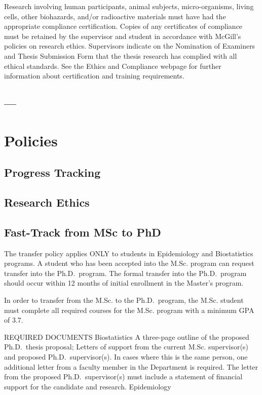 \documentclass[
]{book}
\begin{document}
Research involving human participants, animal subjects, micro-organisms, living cells, other biohazards, and/or radioactive materials must have had the appropriate compliance certification. Copies of any certificates of compliance must be retained by the supervisor and student in accordance with McGill's policies on research ethics. Supervisors indicate on the Nomination of Examiners and Thesis Submission Form that the thesis research has complied with all ethical standards. See the Ethics and Compliance webpage for further information about certification and training requirements.

\hypertarget{section-6}{%
\section{---}\label{section-6}}

\hypertarget{policies}{%
\chapter{Policies}\label{policies}}

\hypertarget{progress-tracking}{%
\section{Progress Tracking}\label{progress-tracking}}

\hypertarget{research-ethics}{%
\section{Research Ethics}\label{research-ethics}}

\hypertarget{fast-track-from-msc-to-phd}{%
\section{Fast-Track from MSc to PhD}\label{fast-track-from-msc-to-phd}}

The transfer policy applies ONLY to students in Epidemiology and Biostatistics programs. A student who has been accepted into the M.Sc. program can request transfer into the Ph.D.~program. The formal transfer into the Ph.D.~program should occur within 12 months of initial enrollment in the Master's program.

In order to transfer from the M.Sc. to the Ph.D.~program, the M.Sc. student must complete all required courses for the M.Sc. program with a minimum GPA of 3.7.

REQUIRED DOCUMENTS
Biostatistics
A three-page outline of the proposed Ph.D.~thesis proposal;
Letters of support from the current M.Sc. supervisor(s) and proposed Ph.D.~supervisor(s). In cases where this is the same person, one additional letter from a faculty member in the Department is required. The letter from the proposed Ph.D.~supervisor(s) must include a statement of financial support for the candidate and research.
Epidemiology
\end{document}
